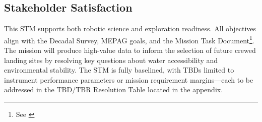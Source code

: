 \subsection*{Stakeholder Satisfaction}

This STM supports both robotic science and exploration readiness. All objectives align with the Decadal Survey, MEPAG goals, and the Mission Task Document\footnote{See \cite{nrc_2022_decadal, mepag_goals, lspace_stm_module}}. The mission will produce high-value data to inform the selection of future crewed landing sites by resolving key questions about water accessibility and environmental stability. The STM is fully baselined, with TBDs limited to instrument performance parameters or mission requirement margins—each to be addressed in the TBD/TBR Resolution Table located in the appendix.




